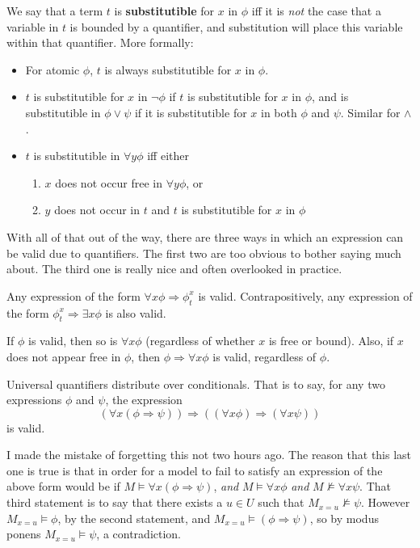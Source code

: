 \begin{definition}
    We say that a term $t$ is \textbf{substitutible} for $x$ in $\phi$ iff it is \textit{not} the case that a variable in $t$ is bounded by a quantifier, and substitution will place this variable within that quantifier. More formally: 
    \begin{itemize}
        \item For atomic $\phi$, $t$ is always substitutible for $x$ in $\phi$.
        \item $t$ is substitutible for $x$ in $\neg \phi$ if $t$ is substitutible for $x$ in $\phi$, and is substitutible in $\phi \vee \psi$ if it is substitutible for $x$ in both $\phi$ and $\psi$. Similar for $\wedge$.
        \item $t$ is substitutible in $\forall y \phi$ iff either
        \begin{enumerate}
            \item $x$ does not occur free in $\forall y \phi$, or
            \item $y$ does not occur in $t$ and $t$ is substitutible for $x$ in $\phi$
        \end{enumerate}
    \end{itemize}
\end{definition}
\par With all of that out of the way, there are three ways in which an expression can be valid due to quantifiers. The first two are too obvious to bother saying much about. The third one is really nice and often overlooked in practice.
\begin{fact}
    Any expression of the form $\forall x \phi \Rightarrow \phi_t^x$ is valid. Contrapositively, any expression of the form $\phi_t^x \Rightarrow \exists x \phi$ is also valid.
\end{fact}
\begin{fact}
    If $\phi$ is valid, then so is $\forall x \phi$ (regardless of whether $x$ is free or bound). Also, if $x$ does not appear free in $\phi$, then $\phi \Rightarrow \forall x \phi$ is valid, regardless of $\phi$.
\end{fact}
\begin{fact}
    Universal quantifiers distribute over conditionals. That is to say, for any two expressions $\phi$ and $\psi$, the expression \[ (\forall x (\phi \Rightarrow \psi)) \Rightarrow ((\forall x \phi) \Rightarrow (\forall x \psi)) \]
    is valid.
\end{fact}
I made the mistake of forgetting this not two hours ago. The reason that this last one is true is that in order for a model to fail to satisfy an expression of the above form would be if $M \models \forall x(\phi \Rightarrow \psi)$, \textit{and} $M \models \forall x \phi$ \textit{and} $M \nvDash \forall x \psi$. That third statement is to say that there exists a $u \in U$ such that $M_{x = u} \nvDash \psi$. However $M_{x=u} \models \phi$, by the second statement, and $M_{x=u} \models (\phi \Rightarrow \psi)$, so by modus ponens $M_{x=u} \models \psi$, a contradiction.
